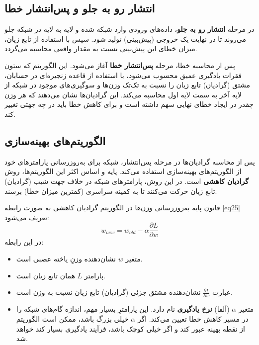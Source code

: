 \subsection{انتشار رو به جلو و پس‌انتشار خطا}\label{subsec:4-4-1}
در مرحله \textbf{انتشار رو به جلو}، داده‌های ورودی وارد شبکه شده و لایه به لایه در شبکه جلو می‌روند تا در نهایت یک خروجی (پیش‌بینی) تولید شود. سپس با استفاده از تابع زیان، میزان خطای این پیش‌بینی نسبت به مقدار واقعی محاسبه می‌گردد.

پس از محاسبه خطا، مرحله \textbf{پس‌انتشار خطا} آغاز می‌شود. این الگوریتم که ستون فقرات یادگیری عمیق محسوب می‌شود\cite{rumelhart1986learning}، با استفاده از قاعده زنجیره‌ای در حسابان، مشتق (گرادیان) تابع زیان را نسبت به تک‌تک وزن‌ها و سوگیری‌های موجود در شبکه از لایه آخر به سمت لایه اول محاسبه می‌کند. این گرادیان‌ها نشان می‌دهند که هر وزن چقدر در ایجاد خطای نهایی سهم داشته است و برای کاهش خطا باید در چه جهتی تغییر کند.

\subsection{الگوریتم‌های بهینه‌سازی}\label{subsec:4-4-2}
پس از محاسبه گرادیان‌ها در مرحله پس‌انتشار، شبکه برای به‌روزرسانی پارامترهای خود از الگوریتم‌های بهینه‌سازی استفاده می‌کند. پایه و اساس اکثر این الگوریتم‌ها، روش \textbf{گرادیان کاهشی} است. در این روش، پارامترهای شبکه در خلاف جهت شیب (گرادیان) تابع زیان حرکت می‌کنند تا به کمینه سراسری (کمترین میزان خطا) برسند. 

قانون پایه به‌روزرسانی وزن‌ها در الگوریتم گرادیان کاهشی به صورت رابطه \eqref{eq25} تعریف می‌شود:
\begin{equation} \label{eq25}
	w_{new} = w_{old} - \alpha \frac{\partial L}{\partial w}
\end{equation}
در این رابطه:
\begin{itemize}
	\item متغیر $w$ نشان‌دهنده وزنِ یاخته عصبی است.
	\item پارامتر $L$ همان تابع زیان است.
	\item عبارت $\frac{\partial L}{\partial w}$ نشان‌دهنده مشتق جزئی (گرادیان) تابع زیان نسبت به وزن است.
	\item متغیر $\alpha$ (آلفا) \textbf{نرخ یادگیری} نام دارد. این پارامترِ بسیار مهم، اندازه گام‌های شبکه را در مسیر کاهش خطا تعیین می‌کند. اگر $\alpha$ خیلی بزرگ باشد، ممکن است الگوریتم از نقطه بهینه عبور کند و اگر خیلی کوچک باشد، فرآیند یادگیری بسیار کند خواهد شد.
\end{itemize}

